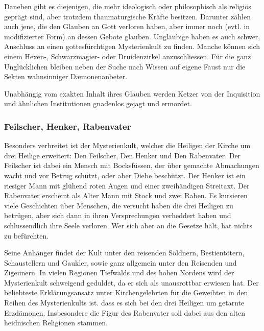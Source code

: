 \documentclass[10pt,twoside,twocolumn,openany]{book}
\begin{document}
	Daneben gibt es diejenigen, die mehr ideologisch oder philosophisch als religiös geprägt sind, aber trotzdem thaumaturgische Kräfte besitzen. Darunter zählen auch jene, die den Glauben an Gott verloren haben, aber immer noch (evtl. in modifizierter Form) an dessen Gebote glauben. Ungläubige haben es auch schwer, Anschluss an einen gottesfürchtigen Mysterienkult zu finden. Manche können sich einem Hexen-, Schwarzmagier- oder Druidenzirkel anzuschliessen. Für die ganz Unglücklichen bleiben neben der Suche nach Wissen auf eigene Faust nur die Sekten wahnsinniger D\ae monenanbeter.
	
	Unabhängig vom exakten Inhalt ihres Glauben werden Ketzer von der Inquisition und ähnlichen Institutionen gnadenlos gejagt und ermordet.
	

	\subsubsection{Feilscher, Henker, Rabenvater}
	Besonders verbreitet ist der Mysterienkult, welcher die Heiligen der Kirche um drei Heilige erweitert: Den Feilscher, Den Henker und Den Rabenvater.
	Der Feilscher ist dabei ein Mensch mit Bocksfüssen, der über gemachte Abmachungen wacht und vor Betrug schützt, oder aber Diebe beschützt. Der Henker ist ein riesiger Mann mit glühend roten Augen und einer zweihändigen Streitaxt. Der Rabenvater erscheint als Alter Mann mit Stock und zwei Raben. Es kursieren viele Geschichten über Menschen, die versucht haben die drei Heiligen zu betrügen, aber sich dann in ihren Versprechungen verheddert haben und schlussendlich ihre Seele verloren. Wer sich aber an die Gesetze hält, hat nichts zu befürchten.
	
	Seine Anhänger findet der Kult unter den reisenden Söldnern, Bestientötern, Schaustellern und Gaukler, sowie ganz allgemein unter den Reisenden und Zigeunern. In vielen Regionen Tiefwalds und des hohen Nordens wird der Mysterienkult schweigend geduldet, da er sich als unausrottbar erwiesen hat. Der beliebteste Erklärungsansatz unter Kirchengelehrten für die Geweihten in den Reihen des Mysterienkults ist. dass es sich bei den drei Heiligen um getarnte Erzdämonen. Insbesondere die Figur des Rabenvater soll dabei aus den alten heidnischen Religionen stammen.
	
\end{document}
